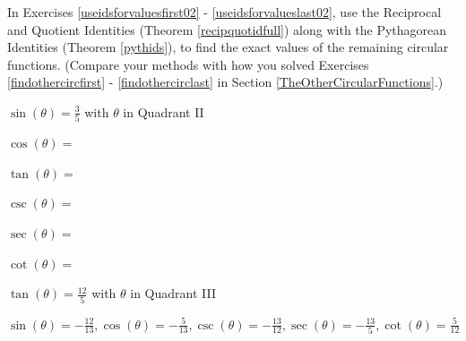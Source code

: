 \documentclass{ximera}
\begin{document}
\begin{question}
In Exercises \ref{useidsforvaluesfirst02} - \ref{useidsforvalueslast02}, use the Reciprocal and Quotient Identities (Theorem \ref{recipquotidfull}) along with the Pythagorean Identities (Theorem \ref{pythids}), to find the exact values of the remaining circular functions.  (Compare your methods with how you solved Exercises \ref{findothercircfirst} - \ref{findothercirclast} in Section \ref{TheOtherCircularFunctions}.)

\begin{problem}\label{useidsforvaluesfirst02}
     $\sin(\theta) = \frac{3}{5}$ with $\theta$ in Quadrant II

$\cos(\theta) = $
\begin{multipleChoice}
\end{multipleChoice}

$\tan(\theta) = $
\begin{multipleChoice}
\end{multipleChoice}

$\csc(\theta) = $
\begin{multipleChoice}
\end{multipleChoice}

$\sec(\theta) = $
\begin{multipleChoice}
\end{multipleChoice}

$\cot(\theta) = $
\begin{multipleChoice}
\end{multipleChoice}

\end{problem}

\begin{problem}
    $\tan(\theta) = \frac{12}{5}$ with $\theta$ in Quadrant III

\begin{solution}
 $\sin(\theta) = -\frac{12}{13}, \cos(\theta) = -\frac{5}{13},  \csc(\theta) = -\frac{13}{12}, \sec(\theta) = -\frac{13}{5}, \cot(\theta) = \frac{5}{12}$
\end{solution}
\end{problem}


\end{question}
\end{document}
